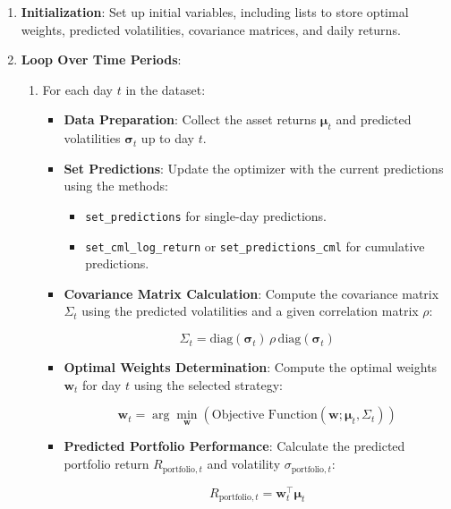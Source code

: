 \begin{enumerate}
    \item \textbf{Initialization}: Set up initial variables, including lists to store optimal weights, predicted volatilities, covariance matrices, and daily returns.
    \item \textbf{Loop Over Time Periods}:
    \begin{enumerate}
        \item For each day \( t \) in the dataset:
        \begin{itemize}
            \item \textbf{Data Preparation}: Collect the asset returns \( \boldsymbol{\mu}_t \) and predicted volatilities \( \boldsymbol{\sigma}_t \) up to day \( t \).
            \item \textbf{Set Predictions}: Update the optimizer with the current predictions using the methods:
            \begin{itemize}
                \item \texttt{set\_predictions} for single-day predictions.
                \item \texttt{set\_cml\_log\_return} or \texttt{set\_predictions\_cml} for cumulative predictions.
            \end{itemize}
            \item \textbf{Covariance Matrix Calculation}: Compute the covariance matrix \( \Sigma_t \) using the predicted volatilities and a given correlation matrix \( \rho \):

            \[
            \Sigma_t = \text{diag}(\boldsymbol{\sigma}_t) \, \rho \, \text{diag}(\boldsymbol{\sigma}_t)
            \]

            \item \textbf{Optimal Weights Determination}: Compute the optimal weights \( \mathbf{w}_t \) for day \( t \) using the selected strategy:

            \[
            \mathbf{w}_t = \arg\min_{\mathbf{w}} \left( \text{Objective Function}(\mathbf{w}; \boldsymbol{\mu}_t, \Sigma_t) \right)
            \]

            \item \textbf{Predicted Portfolio Performance}: Calculate the predicted portfolio return \( R_{\text{portfolio}, t} \) and volatility \( \sigma_{\text{portfolio}, t} \):

            \[
            R_{\text{portfolio}, t} = \mathbf{w}_t^\top \boldsymbol{\mu}_t
            \]


\end{itemize}
\end{enumerate}
\end{enumerate}
